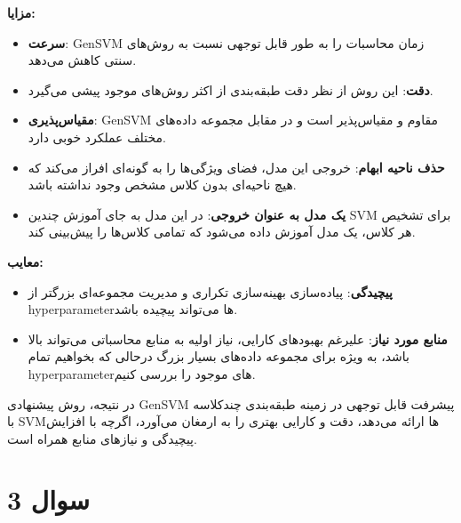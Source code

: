 \documentclass{article}
\begin{document}
\textbf{مزایا:}
\begin{itemize}
    \item \textbf{سرعت}: GenSVM زمان محاسبات را به طور قابل توجهی نسبت به روش‌های سنتی کاهش می‌دهد.
    \item \textbf{دقت}: این روش از نظر دقت طبقه‌بندی از اکثر روش‌های موجود پیشی می‌گیرد.
    \item \textbf{مقیاس‌پذیری}: GenSVM مقاوم و مقیاس‌پذیر است و در مقابل مجموعه داده‌های مختلف عملکرد خوبی دارد.
    \item \textbf{حذف ناحیه ابهام}: خروجی این مدل، فضای ویژگی‌ها را به گونه‌ای افراز می‌کند که هیچ ناحیه‌ای بدون کلاس مشخص وجود نداشته باشد.
    \item \textbf{یک مدل به عنوان خروجی}: در این مدل به جای آموزش چندین SVM برای تشخیص هر کلاس، یک مدل آموزش داده می‌شود که تمامی کلاس‌ها را پیش‌بینی کند.
\end{itemize}

\textbf{معایب:}
\begin{itemize}
    \item \textbf{پیچیدگی}: پیاده‌سازی بهینه‌سازی تکراری و مدیریت مجموعه‌ای بزرگتر از hyperparameterها می‌تواند پیچیده باشد.
    \item \textbf{منابع مورد نیاز}: علیرغم بهبودهای کارایی، نیاز اولیه به منابع محاسباتی می‌تواند بالا باشد، به ویژه برای مجموعه داده‌های بسیار بزرگ درحالی که بخواهیم تمام hyperparameterهای موجود را بررسی کنیم.
\end{itemize}

در نتیجه، روش پیشنهادی GenSVM پیشرفت قابل توجهی در زمینه طبقه‌بندی چندکلاسه با SVMها ارائه می‌دهد، دقت و کارایی بهتری را به ارمغان می‌آورد، اگرچه با افزایش پیچیدگی و نیازهای منابع همراه است.

\section{سوال 3}
\end{document}
